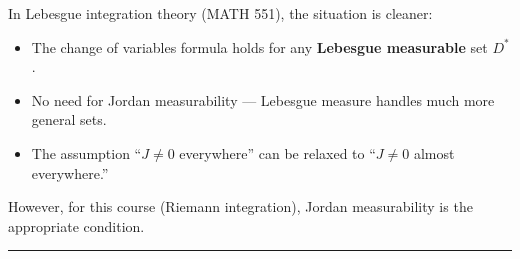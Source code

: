 \documentclass[11pt]{report}
\begin{document}
\begin{remark}
In Lebesgue integration theory (MATH 551), the situation is cleaner:
\begin{itemize}
    \item The change of variables formula holds for any \textbf{Lebesgue measurable} set $D^*$.
    \item No need for Jordan measurability --- Lebesgue measure handles much more general sets.
    \item The assumption ``$J \neq 0$ everywhere'' can be relaxed to ``$J \neq 0$ almost everywhere.''
\end{itemize}

However, for this course (Riemann integration), Jordan measurability is the appropriate condition.
\end{remark}

\bigskip
\hrule
\bigskip
\end{document}
